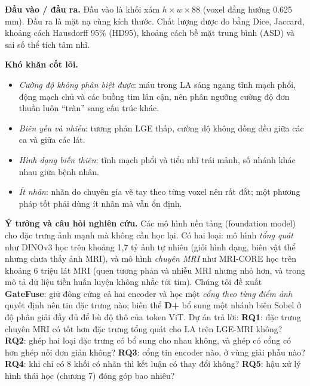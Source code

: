 \documentclass[11pt,a4paper]{article}
\newcommand{\RQ}[1]{\textbf{RQ#1}}
\begin{document}
\textbf{Đầu vào / đầu ra.} Đầu vào là khối xám $h\times w\times 88$ (voxel đẳng hướng 0.625\,mm). Đầu ra là mặt nạ cùng kích thước. Chất lượng được đo bằng Dice, Jaccard, khoảng cách Hausdorff 95\% (HD95), khoảng cách bề mặt trung bình (ASD) và sai số thể tích tâm nhĩ.

\textbf{Khó khăn cốt lõi.}
\begin{itemize}
\item \emph{Cường độ không phân biệt được}: máu trong LA sáng ngang tĩnh mạch phổi, động mạch chủ và các buồng tim lân cận, nên phân ngưỡng cường độ đơn thuần luôn ``tràn'' sang cấu trúc khác.
\item \emph{Biên yếu và nhiễu}: tương phản LGE thấp, cường độ không đồng đều giữa các ca và giữa các lát.
\item \emph{Hình dạng biến thiên}: tĩnh mạch phổi và tiểu nhĩ trái mảnh, số nhánh khác nhau giữa bệnh nhân.
\item \emph{Ít nhãn}: nhãn do chuyên gia vẽ tay theo từng voxel nên rất đắt; một phương pháp tốt phải dùng ít nhãn mà vẫn ổn định.
\end{itemize}

\textbf{Ý tưởng và câu hỏi nghiên cứu.} Các mô hình nền tảng (foundation model) cho đặc trưng ảnh mạnh mà không cần học lại. Có hai loại: mô hình \emph{tổng quát} như DINOv3 \cite{dinov3} học trên khoảng 1,7 tỷ ảnh tự nhiên (giỏi hình dạng, biên vật thể nhưng chưa thấy ảnh MRI), và mô hình \emph{chuyên MRI} như MRI-CORE \cite{mricore} học trên khoảng 6 triệu lát MRI (quen tương phản và nhiễu MRI nhưng nhỏ hơn, và trong mô tả dữ liệu tiền huấn luyện không nhắc tới tim). Chúng tôi đề xuất \textbf{GateFuse}: giữ đông cứng cả hai encoder và học một \emph{cổng theo từng điểm ảnh} quyết định nên tin đặc trưng nào; biến thể \textbf{D+} bổ sung một nhánh biên Sobel ở độ phân giải đầy đủ để bù độ thô của token ViT. Dự án trả lời:
\RQ{1}: đặc trưng chuyên MRI có tốt hơn đặc trưng tổng quát cho LA trên LGE-MRI không? \;
\RQ{2}: ghép hai loại đặc trưng có bổ sung cho nhau không, và ghép có cổng có hơn ghép nối đơn giản không? \;
\RQ{3}: cổng tin encoder nào, ở vùng giải phẫu nào? \;
\RQ{4}: khi chỉ có 8 khối có nhãn thì kết luận có thay đổi không? \;
\RQ{5}: hậu xử lý hình thái học (chương 7) đóng góp bao nhiêu?

\end{document}
